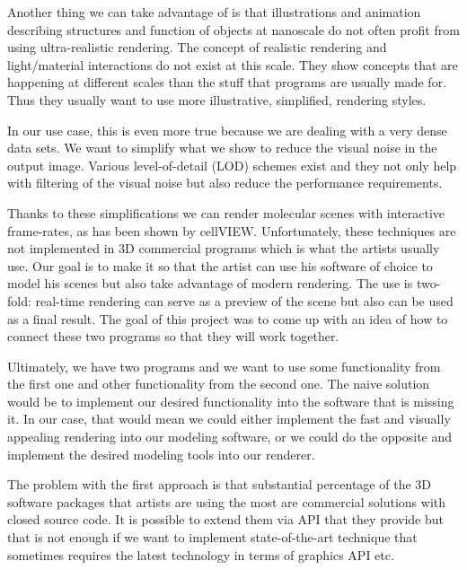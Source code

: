 \documentclass[
  digital, %
  table,   %
  nolof,     %
  nolot,     %
]{fithesis3}
\begin{document}
Another thing we can take advantage of is that illustrations and animation describing structures and function of objects at nanoscale do not often profit from using ultra-realistic rendering. The concept of realistic rendering and light/material interactions do not exist at this scale. They show concepts that are happening at different scales than the stuff that programs are usually made for. Thus they usually want to use more illustrative, simplified, rendering styles.

In our use case, this is even more true because we are dealing with a very dense data sets. We want to simplify what we show to reduce the visual noise in the output image. Various level-of-detail (LOD) schemes exist and they not only help with filtering of the visual noise but also reduce the performance requirements.

Thanks to these simplifications we can render molecular scenes with interactive frame-rates, as has been shown by cellVIEW\cite{cellVIEW_2015}. Unfortunately, these techniques are not implemented in 3D commercial programs which is what the artists usually use. Our goal is to make it so that the artist can use his software of choice to model his scenes but also take advantage of modern rendering. The use is two-fold: real-time rendering can serve as a preview of the scene but also can be used as a final result. The goal of this project was to come up with an idea of how to connect these two programs so that they will work together.

Ultimately, we have two programs and we want to use some functionality from the first one and other functionality from the second one. The naive solution would be to implement our desired functionality into the software that is missing it. In our case, that would mean we could either implement the fast and visually appealing rendering into our modeling software, or we could do the opposite and implement the desired modeling tools into our renderer.

The problem with the first approach is that substantial percentage of the 3D software packages that artists are using the most are commercial solutions with closed source code. It is possible to extend them via API that they provide but that is not enough if we want to implement state-of-the-art technique that sometimes requires the latest technology in terms of graphics API etc.
\end{document}
